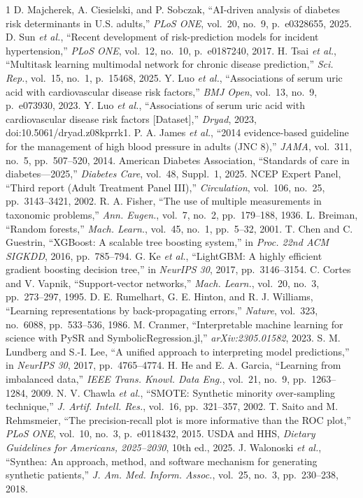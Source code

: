\documentclass[journal]{IEEEtran}
\begin{document}
\begin{thebibliography}{1}
 D. Majcherek, A. Ciesielski, and P. Sobczak, ``AI-driven analysis of diabetes risk determinants in U.S. adults,'' \emph{PLoS ONE}, vol.~20, no.~9, p.~e0328655, 2025.
 D. Sun \textit{et al.}, ``Recent development of risk-prediction models for incident hypertension,'' \emph{PLoS ONE}, vol.~12, no.~10, p.~e0187240, 2017.
 H. Tsai \textit{et al.}, ``Multitask learning multimodal network for chronic disease prediction,'' \emph{Sci. Rep.}, vol.~15, no.~1, p.~15468, 2025.
 Y. Luo \textit{et al.}, ``Associations of serum uric acid with cardiovascular disease risk factors,'' \emph{BMJ Open}, vol.~13, no.~9, p.~e073930, 2023.
 Y. Luo \textit{et al.}, ``Associations of serum uric acid with cardiovascular disease risk factors [Dataset],'' \emph{Dryad}, 2023, doi:10.5061/dryad.z08kprrk1.
 P. A. James \textit{et al.}, ``2014 evidence-based guideline for the management of high blood pressure in adults (JNC 8),'' \emph{JAMA}, vol.~311, no.~5, pp.~507--520, 2014.
 American Diabetes Association, ``Standards of care in diabetes---2025,'' \emph{Diabetes Care}, vol.~48, Suppl.~1, 2025.
 NCEP Expert Panel, ``Third report (Adult Treatment Panel III),'' \emph{Circulation}, vol.~106, no.~25, pp.~3143--3421, 2002.
 R. A. Fisher, ``The use of multiple measurements in taxonomic problems,'' \emph{Ann. Eugen.}, vol.~7, no.~2, pp.~179--188, 1936.
 L. Breiman, ``Random forests,'' \emph{Mach. Learn.}, vol.~45, no.~1, pp.~5--32, 2001.
 T. Chen and C. Guestrin, ``XGBoost: A scalable tree boosting system,'' in \emph{Proc. 22nd ACM SIGKDD}, 2016, pp.~785--794.
 G. Ke \textit{et al.}, ``LightGBM: A highly efficient gradient boosting decision tree,'' in \emph{NeurIPS 30}, 2017, pp.~3146--3154.
 C. Cortes and V. Vapnik, ``Support-vector networks,'' \emph{Mach. Learn.}, vol.~20, no.~3, pp.~273--297, 1995.
 D. E. Rumelhart, G. E. Hinton, and R. J. Williams, ``Learning representations by back-propagating errors,'' \emph{Nature}, vol.~323, no.~6088, pp.~533--536, 1986.
 M. Cranmer, ``Interpretable machine learning for science with PySR and SymbolicRegression.jl,'' \emph{arXiv:2305.01582}, 2023.
 S. M. Lundberg and S.-I. Lee, ``A unified approach to interpreting model predictions,'' in \emph{NeurIPS 30}, 2017, pp.~4765--4774.
 H. He and E. A. Garcia, ``Learning from imbalanced data,'' \emph{IEEE Trans. Knowl. Data Eng.}, vol.~21, no.~9, pp.~1263--1284, 2009.
 N. V. Chawla \textit{et al.}, ``SMOTE: Synthetic minority over-sampling technique,'' \emph{J. Artif. Intell. Res.}, vol.~16, pp.~321--357, 2002.
 T. Saito and M. Rehmsmeier, ``The precision-recall plot is more informative than the ROC plot,'' \emph{PLoS ONE}, vol.~10, no.~3, p.~e0118432, 2015.
 USDA and HHS, \emph{Dietary Guidelines for Americans, 2025--2030}, 10th ed., 2025.
 J. Walonoski \textit{et al.}, ``Synthea: An approach, method, and software mechanism for generating synthetic patients,'' \emph{J. Am. Med. Inform. Assoc.}, vol.~25, no.~3, pp.~230--238, 2018.
\end{thebibliography}
\end{document}
